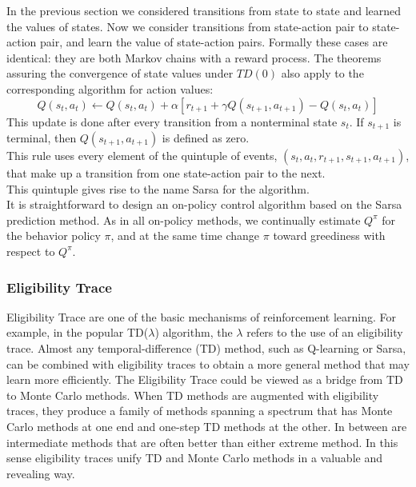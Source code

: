 \documentclass[11pt]{article}
\theoremstyle{plain}
\theoremstyle{definition}
\begin{document}
In the previous section we considered transitions from state to state and learned the values of states. Now we consider transitions from state-action pair to state-action pair, and learn the value of state-action pairs. Formally these cases are identical: they are both Markov chains with a reward process. The theorems assuring the convergence of state values under $TD(0)$ also apply to the corresponding algorithm for action values: 
\begin{equation}
Q(s_t,a_t) \leftarrow Q(s_t,a_t) + \alpha [r_{t+1}+\gamma Q(s_{t+1},a_{t+1})-Q(s_t,a_t)]
\end{equation}
This update is done after every transition from a nonterminal state $s_t$. If $s_{t+1}$ is terminal, then $Q(s_{t+1},a_{t+1})$ is defined as zero.\\

This rule uses every element of the quintuple of events, $(s_t ,a_t ,r_{t+1} ,s_{t+1},a_{t+1})$, that make up a transition from one state-action pair to the next. \\

This quintuple gives rise to the name Sarsa for the algorithm.\\

It is straightforward to design an on-policy control algorithm based on the Sarsa prediction method. As in all on-policy methods, we continually estimate $Q^\pi$ for the behavior policy $\pi$, and at the same time change $\pi$ toward greediness with respect to  $Q^\pi$. 
\subsubsection{Eligibility Trace}
Eligibility Trace are one of the basic mechanisms of reinforcement learning. For example, in the popular TD($\lambda $) algorithm, the $\lambda $ refers to the use of an eligibility trace. Almost any temporal-difference (TD) method, such as Q-learning or Sarsa, can be combined with eligibility traces to obtain a more general method that may learn more efficiently.
The Eligibility Trace could be viewed as a bridge from TD to Monte Carlo methods. When TD methods are augmented with eligibility traces, they produce a family of methods spanning a spectrum that has Monte Carlo methods at one end and one-step TD methods at the other. In between are intermediate methods that are often better than either extreme method. In this sense eligibility traces unify TD and Monte Carlo methods in a valuable and revealing way.
\end{document}
